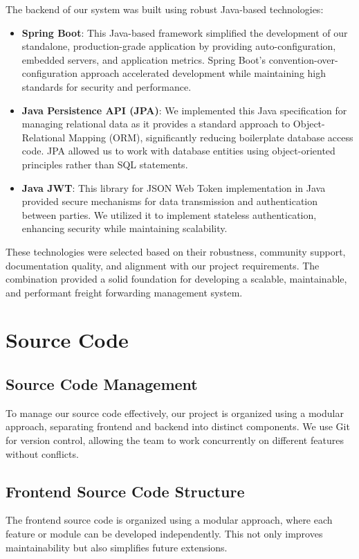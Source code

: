 The backend of our system was built using robust Java-based technologies:

\begin{itemize}
    \item \textbf{Spring Boot}: This Java-based framework simplified the development of our standalone, production-grade application by providing auto-configuration, embedded servers, and application metrics. Spring Boot's convention-over-configuration approach accelerated development while maintaining high standards for security and performance.

    \item \textbf{Java Persistence API (JPA)}: We implemented this Java specification for managing relational data as it provides a standard approach to Object-Relational Mapping (ORM), significantly reducing boilerplate database access code. JPA allowed us to work with database entities using object-oriented principles rather than SQL statements.

    \item \textbf{Java JWT}: This library for JSON Web Token implementation in Java provided secure mechanisms for data transmission and authentication between parties. We utilized it to implement stateless authentication, enhancing security while maintaining scalability.
\end{itemize}

These technologies were selected based on their robustness, community support, documentation quality, and alignment with our project requirements. The combination provided a solid foundation for developing a scalable, maintainable, and performant freight forwarding management system.

\section{Source Code}

\subsection{Source Code Management}
To manage our source code effectively, our project is organized using a modular approach, separating frontend and backend into distinct components. We use Git for version control, allowing the team to work concurrently on different features without conflicts.

\subsection{Frontend Source Code Structure}
The frontend source code is organized using a modular approach, where each feature or module can be developed independently. This not only improves maintainability but also simplifies future extensions.

